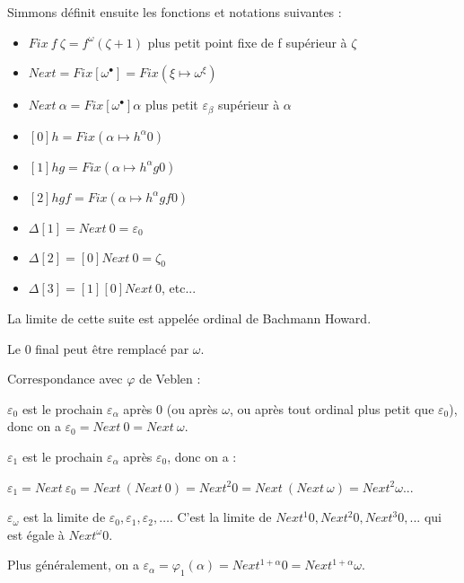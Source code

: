 \documentclass[12pt]{beamer}
\begin{document}
\begin{frame}

Simmons définit ensuite les fonctions et notations suivantes :

\begin{itemize}
\item \( Fix\ f\ \zeta = f^\omega(\zeta+1) \) plus petit point fixe de f supérieur à \( \zeta \)
\item \( Next = Fix [\omega^\bullet] = Fix (\xi \mapsto \omega^\xi) \)
\item \( Next\ \alpha = Fix [\omega^\bullet] \alpha \) plus petit \( \varepsilon_\beta \) supérieur à \( \alpha \)
\item \( [0] h = Fix (\alpha \mapsto h^\alpha 0) \)
\item \( [1] h g = Fix (\alpha \mapsto h^\alpha g 0) \)
\item \( [2] h g f = Fix (\alpha \mapsto h^\alpha g f 0) \) 
\item \( \Delta[1] = Next\ 0 = \varepsilon_0 \)
\item \( \Delta[2] = [0] Next\ 0 = \zeta_0 \)
\item \( \Delta[3] = [1] [0] Next\ 0 \), etc...
\end{itemize}
La limite de cette suite est appelée ordinal de Bachmann Howard.

Le 0 final peut être remplacé par $\omega$.

\end{frame}
\begin{frame}

Correspondance avec \(\varphi\) de Veblen :

\medskip

\( \varepsilon_0 \) est le prochain \( \varepsilon_\alpha \) après 0 (ou après \( \omega \), ou après tout ordinal plus petit que \( \varepsilon_0 \)), donc on a \( \varepsilon_0 = Next\ 0 = Next\ \omega \).

\( \varepsilon_1 \) est le prochain \( \varepsilon_\alpha \) après \( \varepsilon_0 \), donc on a :

\( \varepsilon_1 = Next\ \varepsilon_0 = Next\ (Next\ 0) = Next^2 0 = Next\ (Next\ \omega) = Next^2 \omega \)...

\( \varepsilon_\omega \) est la limite de \( \varepsilon_0, \varepsilon_1, \varepsilon_2, \ldots \). C'est la limite de \( Next^1 0, Next^2 0, Next^3 0, ... \) qui est égale à \( Next^\omega 0 \).

Plus généralement, on a  \( \varepsilon_\alpha = \varphi_1(\alpha) = Next^{1+\alpha} 0 = Next^{1+\alpha} \omega \).

\end{frame}
\end{document}
